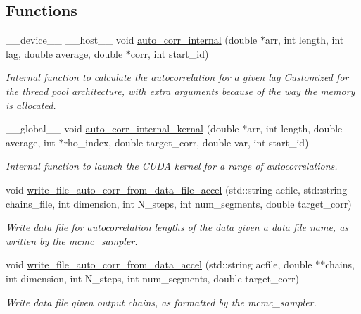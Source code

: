 \subsection*{Functions}
\begin{DoxyCompactItemize}
\item 
\+\_\+\+\_\+device\+\_\+\+\_\+ \+\_\+\+\_\+host\+\_\+\+\_\+ void \hyperlink{autocorrelation__cuda_8cu_a366f884938ea0477409e8d52f0309a44}{auto\+\_\+corr\+\_\+internal} (double $\ast$arr, int length, int lag, double average, double $\ast$corr, int start\+\_\+id)
\begin{DoxyCompactList}\small\item\em Internal function to calculate the autocorrelation for a given lag Customized for the thread pool architecture, with extra arguments because of the way the memory is allocated. \end{DoxyCompactList}\item 
\+\_\+\+\_\+global\+\_\+\+\_\+ void \hyperlink{autocorrelation__cuda_8cu_ad8cff0e627281b397e017fec619b38a5}{auto\+\_\+corr\+\_\+internal\+\_\+kernal} (double $\ast$arr, int length, double average, int $\ast$rho\+\_\+index, double target\+\_\+corr, double var, int start\+\_\+id)
\begin{DoxyCompactList}\small\item\em Internal function to launch the C\+U\+DA kernel for a range of autocorrelations. \end{DoxyCompactList}\item 
void \hyperlink{autocorrelation__cuda_8cu_a4b4ed2b89a95a13abf59d6e373316770}{write\+\_\+file\+\_\+auto\+\_\+corr\+\_\+from\+\_\+data\+\_\+file\+\_\+accel} (std\+::string acfile, std\+::string chains\+\_\+file, int dimension, int N\+\_\+steps, int num\+\_\+segments, double target\+\_\+corr)
\begin{DoxyCompactList}\small\item\em Write data file for autocorrelation lengths of the data given a data file name, as written by the mcmc\+\_\+sampler. \end{DoxyCompactList}\item 
void \hyperlink{autocorrelation__cuda_8cu_a2ba6f84b0a37e4fc578791f745ee9912}{write\+\_\+file\+\_\+auto\+\_\+corr\+\_\+from\+\_\+data\+\_\+accel} (std\+::string acfile, double $\ast$$\ast$chains, int dimension, int N\+\_\+steps, int num\+\_\+segments, double target\+\_\+corr)
\begin{DoxyCompactList}\small\item\em Write data file given output chains, as formatted by the mcmc\+\_\+sampler. \end{DoxyCompactList}\item 
$$
\end{DoxyCompactItemize}
